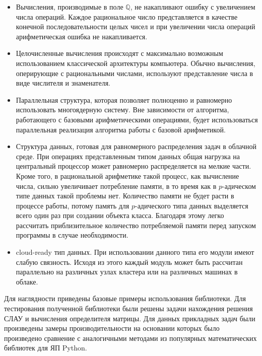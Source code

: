 \documentclass[master, och, autoref, times]{sty/SCWorks}
\theoremstyle{plain}
\theoremstyle{definition}
\numberwithin{equation}{section}
\begin{document}
\begin{itemize}

\item Вычисления, производимые в поле $\mathbb{Q}$, не накапливают ошибку с увеличением числа операций. Каждое рациональное число представляется в качестве конечной последовательности целых чисел и при увеличении числа операций арифметическая ошибка не накапливается.

\item Целочисленные вычисления происходят с максимально возможным использованием классической архитектуры компьютера. Обычно вычисления, оперирующие с рациональными числами, используют представление числа в виде числителя и знаменателя.

\item Параллельная структура, которая позволяет полноценно и равномерно использовать многоядерную систему. Вне зависимости от алгоритма, работающего с базовыми арифметическими операциями, будет использоваться параллельная реализация алгоритма работы с базовой арифметикой.

\item Структура данных, готовая для равномерного распределения задач в облачной среде. При операциях представленным типом данных общая нагрузка на центральный процессор может равномерно распределяется на мелкие части. Кроме того, в рациональной арифметике такой процесс, как вычисление числа, сильно увеличивает потребление памяти, в то время как в $p$-адическом типе данных такой проблемы нет. Количество памяти не будет расти в процессе работы, потому память для $p$-адического типа данных выделяется всего один раз при создании объекта класса. Благодаря этому легко рассчитать приблизительное количество потребляемой памяти перед запуском программы в случае необходимости.

\item cloud-ready тип данных. При использовании данного типа его модули имеют слабую связность. Исходя из этого каждый модуль может быть рассчитан параллельно на различных узлах кластера или на различных машинах в облаке.
\end{itemize}

 Для наглядности приведены базовые примеры использования библиотеки. Для тестирования полученной библиотеки были решены задачи нахождения решения СЛАУ и вычисления определителя матрицы. Для данных прикладных задач были произведены замеры производительности на основании которых было произведено сравнение с аналогичными методами из популярных математических библиотек для ЯП Python. 
\end{document}

